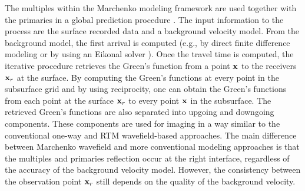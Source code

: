 The multiples within the Marchenko modeling framework are used
together with the primaries in a global prediction procedure
\citep{Behura,Wapenaar,Singh2015}. The input information to the
process are the surface recorded data and a background velocity
model. From the background model, the first arrival is computed
(e.g., by direct finite difference modeling or by using an Eikonal
solver \citep{Behura}). Once the travel time is computed, the
iterative procedure retrieves the Green's function from a point
${\bf x}$ to the receivers ${\bf x}_r$ at the surface. By computing the
Green's functions at every point in the subsurface grid and by using
reciprocity, one can obtain the Green's functions from each point
at the surface ${\bf x}_r$ to every point ${\bf x}$ in the subsurface. The
retrieved Green's functions are also separated into upgoing and
downgoing components. These components are used for imaging in a
way similar to the conventional one-way and RTM wavefield-based
approaches. The main difference between Marchenko wavefield and more
conventional modeling approaches is that the multiples and primaries
reflection occur at the right interface, regardless of the accuracy
of the background velocity model. However, the consistency between
the observation point ${\bf x}_r$ still depends on the quality of the
background velocity.




